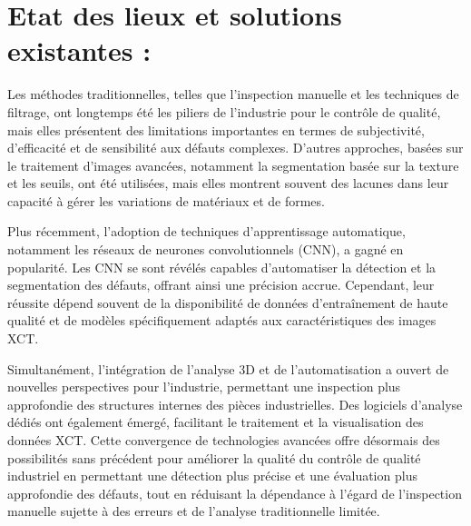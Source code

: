 \documentclass{report}
\newenvironment{mystyle}{
	\setlength{\parindent}{0pt} %
	\setlength{\parskip}{10pt} %
	\fontsize{12pt}{14pt}\selectfont %
}{
}
\begin{document}
	\section{Etat des lieux et solutions existantes :}
			\begin{mystyle}
				Les méthodes traditionnelles, telles que l'inspection manuelle et les techniques de filtrage, ont longtemps été les piliers de l'industrie pour le contrôle de qualité, mais elles présentent des limitations importantes en termes de subjectivité, d'efficacité et de sensibilité aux défauts complexes. D'autres approches, basées sur le traitement d'images avancées, notamment la segmentation basée sur la texture et les seuils, ont été utilisées, mais elles montrent souvent des lacunes dans leur capacité à gérer les variations de matériaux et de formes.
				
				Plus récemment, l'adoption de techniques d'apprentissage automatique, notamment les réseaux de neurones convolutionnels (CNN), a gagné en popularité. Les CNN se sont révélés capables d'automatiser la détection et la segmentation des défauts, offrant ainsi une précision accrue. Cependant, leur réussite dépend souvent de la disponibilité de données d'entraînement de haute qualité et de modèles spécifiquement adaptés aux caractéristiques des images XCT.
				
				Simultanément, l'intégration de l'analyse 3D et de l'automatisation a ouvert de nouvelles perspectives pour l'industrie, permettant une inspection plus approfondie des structures internes des pièces industrielles. Des logiciels d'analyse dédiés ont également émergé, facilitant le traitement et la visualisation des données XCT. Cette convergence de technologies avancées offre désormais des possibilités sans précédent pour améliorer la qualité du contrôle de qualité industriel en permettant une détection plus précise et une évaluation plus approfondie des défauts, tout en réduisant la dépendance à l'égard de l'inspection manuelle sujette à des erreurs et de l'analyse traditionnelle limitée.
			\end{mystyle}
	
\end{document}
